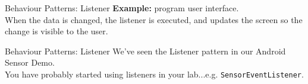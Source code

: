 \documentclass[14pt,aspectratio=169]{beamer}
\begin{document}
\begin{frame}{Behaviour Patterns: Listener}
\textbf{Example:} program user interface.  \\
\vspace{2em}
When the data is changed, the listener is executed, and updates the screen so the change is visible to the user.
\end{frame}



\begin{frame}{Behaviour Patterns: Listener}
We've seen the Listener pattern in our Android Sensor Demo. \\
\vspace{2em}
You have probably started using listeners in your lab...e.g. \texttt{SensorEventListener}.
\end{frame}
\end{document}

